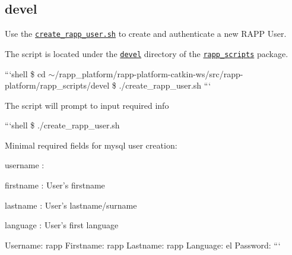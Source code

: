 \subsection*{devel}

Use the \href{https://github.com/rapp-project/rapp-platform/blob/master/rapp_scripts/devel/create_rapp_user.sh}{\tt create\-\_\-rapp\-\_\-user.\-sh} to create and authenticate a new R\-A\-P\-P User.

The script is located under the \href{https://github.com/rapp-project/rapp-platform/tree/master/rapp_scripts/devel}{\tt devel} directory of the \href{https://github.com/rapp-project/rapp-platform/tree/master/rapp_scripts}{\tt rapp\-\_\-scripts} package.

```shell \$ cd $\sim$/rapp\-\_\-platform/rapp-\/platform-\/catkin-\/ws/src/rapp-\/platform/rapp\-\_\-scripts/devel \$ ./create\-\_\-rapp\-\_\-user.sh ```

The script will prompt to input required info

```shell \$ ./create\-\_\-rapp\-\_\-user.sh

Minimal required fields for mysql user creation\-:
\begin{DoxyItemize}
\item username \-:
\item firstname \-: User's firstname
\item lastname \-: User's lastname/surname
\item language \-: User's first language
\end{DoxyItemize}

Username\-: rapp Firstname\-: rapp Lastname\-: rapp Language\-: el Password\-: ``` 
